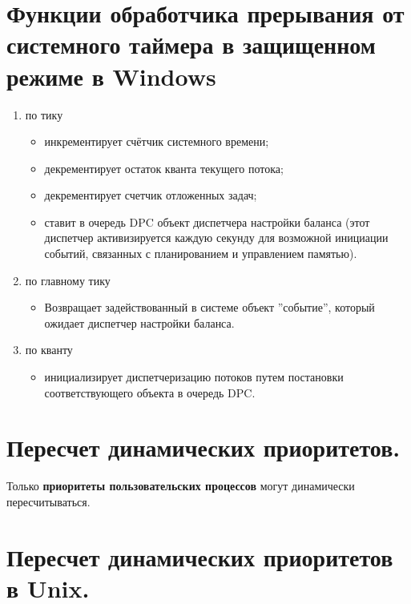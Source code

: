 
\section{Функции обработчика прерывания от системного таймера в защищенном режиме в Windows}

\begin{enumerate}
	\item по тику
	      \begin{itemize}
		      \item инкрементирует счётчик системного времени;
		      \item декрементирует остаток кванта текущего потока;
		      \item декрементирует счетчик отложенных задач;
		      \item ставит в очередь DPC объект диспетчера настройки баланса
		            (этот диспетчер активизируется каждую секунду для возможной инициации событий,
		            связанных с планированием и управлением памятью).
	      \end{itemize}
	\item по главному тику
	      \begin{itemize}
		      \item Возвращает задействованный в системе объект ''событие'', который ожидает диспетчер настройки баланса.
	      \end{itemize}
	\item по кванту
	      \begin{itemize}
		      \item инициализирует диспетчеризацию потоков путем постановки соответствующего объекта в очередь DPC.
	      \end{itemize}
\end{enumerate}

\section{Пересчет динамических приоритетов.}

Только \textbf{приоритеты пользовательских
	процессов} могут динамически пересчитываться.

\section{Пересчет динамических приоритетов в Unix.}

